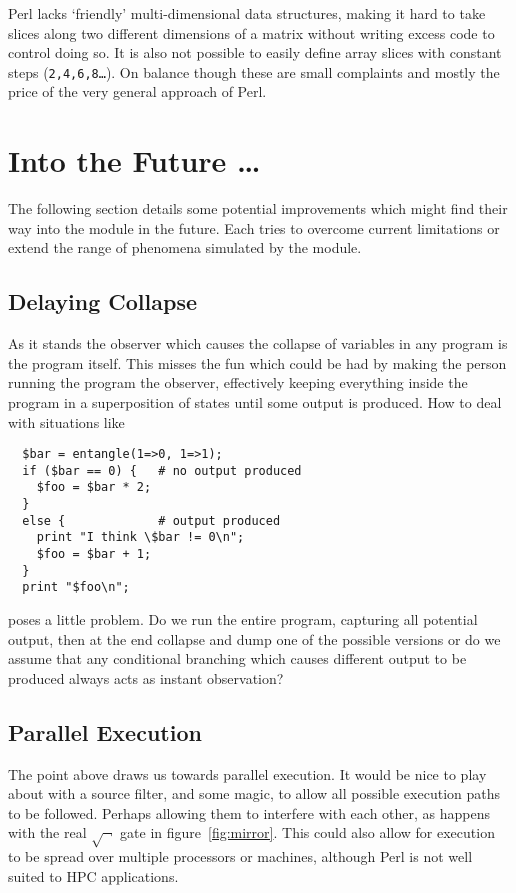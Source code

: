 \documentclass{article}      %
\newcommand{\ptt}[1]{\texttt{#1}}    %
\begin{document}
Perl lacks `friendly' multi-dimensional data structures, making it hard to
take slices along two different dimensions of a matrix without writing
excess code to control doing so.  It is also not possible to easily
define array slices with constant steps (\ptt{2,4,6,8\ldots}). On
balance though these are small complaints and mostly the price of
the very general approach of Perl.

\section{Into the Future \ldots}

The following section details some potential improvements which might
find their way into the module in the future.  Each tries to
overcome current limitations or extend the range of
phenomena simulated by the module.

\subsection{Delaying Collapse}

As it stands the observer which causes the collapse of variables in
any program is the program itself.  This misses the fun which
could be had by making the person running the program the observer,
effectively keeping everything inside the program in a
superposition of states until some output is produced.  How to deal
with situations like
\begin{verbatim}
  $bar = entangle(1=>0, 1=>1);
  if ($bar == 0) {   # no output produced
    $foo = $bar * 2;
  }
  else {             # output produced
    print "I think \$bar != 0\n";
    $foo = $bar + 1;
  }
  print "$foo\n";
\end{verbatim} %
poses a little problem.  Do we run the entire program, capturing
all potential output, then at the end collapse and dump one of the
possible versions or do we assume that any conditional branching which
causes different output to be produced always acts as instant
observation?

\subsection{Parallel Execution}

The point above draws us towards parallel execution.  It would
be nice to play about with a source filter, and some magic, to allow
all possible execution paths to be followed.  Perhaps allowing them to
interfere with each other, as happens with the real $\sqrt{\neg}$ gate
in figure~\ref{fig:mirror}.  This could also allow for execution to be
spread over multiple processors or machines, although Perl is not well
suited to HPC applications.
\end{document}
